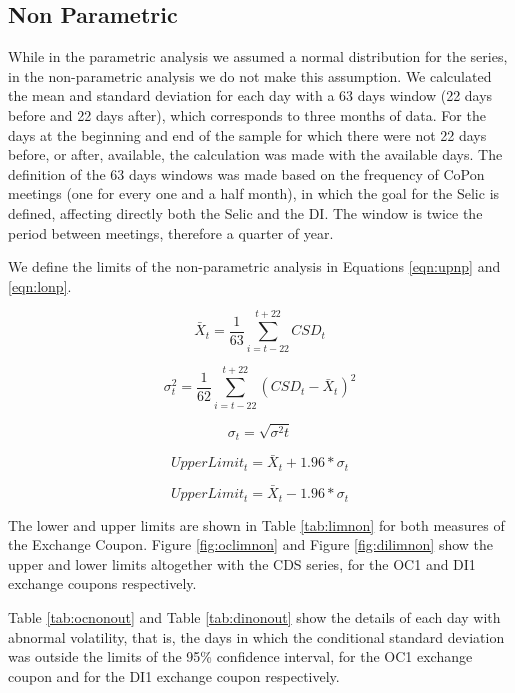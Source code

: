 \documentclass[cic,tc, english]{iiufrgs}
\begin{document}
\subsection{Non Parametric}

    While in the parametric analysis we assumed a normal distribution for the series, in the non-parametric analysis we do not make this assumption. We calculated the mean and standard deviation for each day with a 63 days window (22 days before and 22 days after), which corresponds to three months of data. For the days at the beginning and end of the sample for which there were not 22 days before, or after, available, the calculation was made with the available days. The definition of the 63 days windows was made based on the frequency of CoPon meetings (one for every one and a half month), in which the goal for the Selic is defined, affecting directly both the Selic and the DI. The window is twice the period between meetings, therefore a quarter of year.

    We define the limits of the non-parametric analysis in Equations \ref{eqn:upnp} and \ref{eqn:lonp}.

    $$\bar{X}_t = \frac{1}{63} \displaystyle\sum_{i=t-22}^{t+22} CSD_t$$

    $$\sigma^2_t = \frac{1}{62} \displaystyle\sum_{i=t-22}^{t+22} (CSD_t - \bar{X}_t)^2$$

    $$\sigma_t = \sqrt{\sigma^2t}$$

    \begin{equation}
        \label{eqn:upnp}
        UpperLimit_t = \bar{X}_t + 1.96 * \sigma_t
    \end{equation}

    \begin{equation}
        \label{eqn:lonp}
        UpperLimit_t = \bar{X}_t - 1.96 * \sigma_t
    \end{equation}

    The lower and upper limits are shown in Table \ref{tab:limnon} for both measures of the Exchange Coupon. Figure \ref{fig:oclimnon} and Figure \ref{fig:dilimnon} show the upper and lower limits altogether with the CDS series, for the OC1 and DI1 exchange coupons respectively.

    

    

    

    Table \ref{tab:ocnonout} and Table \ref{tab:dinonout} show the details of each day with abnormal volatility, that is, the days in which the conditional standard deviation was outside the limits of the 95\% confidence interval, for the OC1 exchange coupon and for the DI1 exchange coupon respectively.
\end{document}
